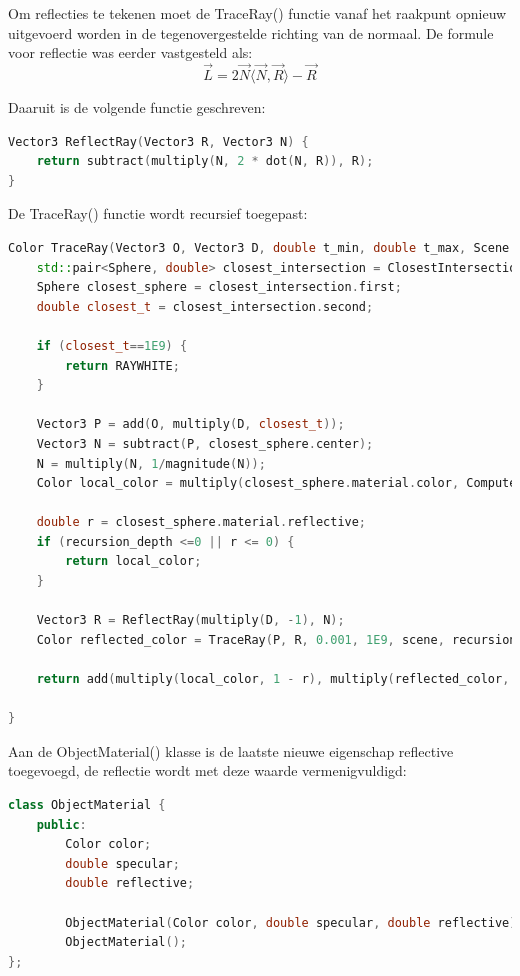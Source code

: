 \documentclass[12pt, a4paper]{article}
\newcommand*{\ora}{\overrightarrow}
\begin{document}
Om reflecties te tekenen moet de TraceRay() functie vanaf het raakpunt opnieuw uitgevoerd worden in de tegenovergestelde richting van de normaal. De formule voor reflectie was eerder vastgesteld als:
\[\ora{L}=2\ora{N}\langle\ora{N},\ora{R}\rangle-\ora{R}\]

Daaruit is de volgende functie geschreven:

\begin{lstlisting}[language=C++]
Vector3 ReflectRay(Vector3 R, Vector3 N) {
    return subtract(multiply(N, 2 * dot(N, R)), R);
}
\end{lstlisting}

De TraceRay() functie wordt recursief toegepast:
\begin{lstlisting}[language=C++]
Color TraceRay(Vector3 O, Vector3 D, double t_min, double t_max, Scene scene, int recursion_depth) {   
    std::pair<Sphere, double> closest_intersection = ClosestIntersection(O, D, t_min, t_max, scene);
    Sphere closest_sphere = closest_intersection.first;
    double closest_t = closest_intersection.second;

    if (closest_t==1E9) {
        return RAYWHITE;
    }

    Vector3 P = add(O, multiply(D, closest_t));
    Vector3 N = subtract(P, closest_sphere.center);
    N = multiply(N, 1/magnitude(N));
    Color local_color = multiply(closest_sphere.material.color, ComputeLighting(P, N, multiply(D, -1), closest_sphere.material.specular, scene));

    double r = closest_sphere.material.reflective;
    if (recursion_depth <=0 || r <= 0) {
        return local_color;
    }

    Vector3 R = ReflectRay(multiply(D, -1), N);
    Color reflected_color = TraceRay(P, R, 0.001, 1E9, scene, recursion_depth - 1);

    return add(multiply(local_color, 1 - r), multiply(reflected_color, r)); 

}
\end{lstlisting}

Aan de ObjectMaterial() klasse is de laatste nieuwe eigenschap reflective toegevoegd, de reflectie wordt met deze waarde vermenigvuldigd:

\begin{lstlisting}[language=C++]
class ObjectMaterial {
    public: 
        Color color;
        double specular;
        double reflective;

        ObjectMaterial(Color color, double specular, double reflective);
        ObjectMaterial();
};
\end{lstlisting}
\end{document}
